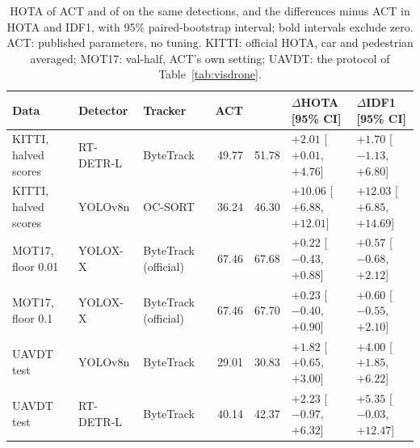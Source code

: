 \begin{table}[t]
\caption{HOTA of ACT \cite{act2026adaptive} and of \scl{} on the same detections, and the
differences \scl{} minus ACT in HOTA and IDF1, with 95\% paired-bootstrap interval; bold intervals
exclude zero. ACT: published parameters, no tuning. KITTI: official HOTA, car and pedestrian averaged;
MOT17: val-half, ACT's own setting; UAVDT: the protocol of Table~\ref{tab:visdrone}.}
\label{tab:act}
\centering\footnotesize
\setlength{\tabcolsep}{4pt}
\begin{tabular}{@{}lllrrll@{}}
\toprule
Data & Detector & Tracker & ACT & \scl{} & $\Delta$HOTA [95\% CI] & $\Delta$IDF1 [95\% CI]\\
\midrule
KITTI, halved scores & RT-DETR-L & ByteTrack & 49.77 & 51.78 & {\boldmath $+2.01$ [$+0.01$, $+4.76$]} & $+1.70$ [$-1.13$, $+6.80$]\\
KITTI, halved scores & YOLOv8n & OC-SORT & 36.24 & 46.30 & {\boldmath $+10.06$ [$+6.88$, $+12.01$]} & {\boldmath $+12.03$ [$+6.85$, $+14.69$]}\\
\addlinespace[3pt]
MOT17, floor 0.01 & YOLOX-X & ByteTrack (official) & 67.46 & 67.68 & $+0.22$ [$-0.43$, $+0.88$] & $+0.57$ [$-0.68$, $+2.12$]\\
MOT17, floor 0.1 & YOLOX-X & ByteTrack (official) & 67.46 & 67.70 & $+0.23$ [$-0.40$, $+0.90$] & $+0.60$ [$-0.55$, $+2.10$]\\
\addlinespace[3pt]
UAVDT test & YOLOv8n & ByteTrack & 29.01 & 30.83 & {\boldmath $+1.82$ [$+0.65$, $+3.00$]} & {\boldmath $+4.00$ [$+1.85$, $+6.22$]}\\
UAVDT test & RT-DETR-L & ByteTrack & 40.14 & 42.37 & $+2.23$ [$-0.97$, $+6.32$] & $+5.35$ [$-0.03$, $+12.47$]\\
\bottomrule
\end{tabular}
\end{table}

